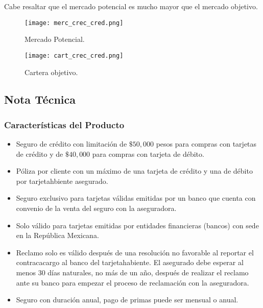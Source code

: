 \documentclass{article}
\begin{document}
Cabe resaltar que el mercado potencial es mucho mayor que el mercado objetivo.
\begin{figure}[H]
    \centering
    \texttt{[image: merc\_crec\_cred.png]}
    \caption{Mercado Potencial.}
\end{figure}
\begin{figure}[H]
    \centering
    \texttt{[image: cart\_crec\_cred.png]}
    \caption{Cartera objetivo.}
\end{figure}
\newpage
\subsection*{Nota Técnica}
\subsubsection*{Características del Producto}
\begin{itemize}
    \item Seguro de crédito con limitación de $\$ 50,000$ pesos para compras con tarjetas de crédito y de $\$ 40,000$ para compras con tarjeta de débito. 
    \item Póliza por cliente con un máximo de una tarjeta de crédito y una de débito por tarjetahbiente asegurado. 
    \item Seguro exclusivo para tarjetas válidas emitidas por un banco que cuenta con convenio de la venta del seguro con la aseguradora. 
    \item Solo válido para tarjetas emitidas por entidades financieras (bancos) con sede en la República Mexicana. 
    \item Reclamo solo es válido después de una resolución no favorable al reportar el contracacargo al banco del tarjetahabiente. El asegurado debe esperar al menos 30 días naturales, no más de un año, después de realizar el reclamo ante su banco para empezar el proceso de reclamación con la aseguradora. 
    \item Seguro con duración anual, pago de primas puede ser mensual o anual.
    
\end{itemize}
\end{document}
